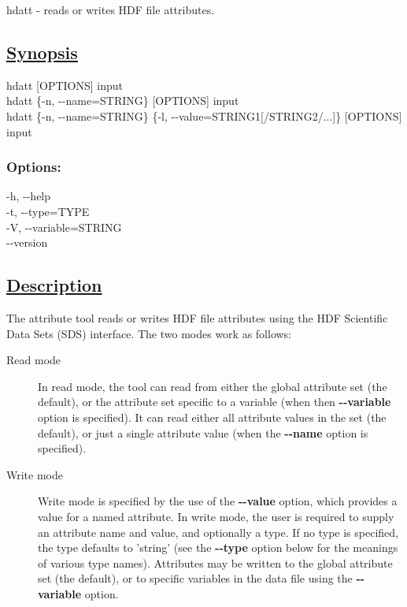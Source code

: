    hdatt - reads or writes HDF file attributes.  
\subsection*{\underline{Synopsis}}


  hdatt [OPTIONS] input\\ 
 hdatt \{-n, -{-}name=STRING\} [OPTIONS] input\\ 
 hdatt \{-n, -{-}name=STRING\} \{-l, -{-}value=STRING1[/STRING2/...]\} [OPTIONS] input\\ 

\subsubsection*{Options:}


  -h, -{-}help\\ 
 -t, -{-}type=TYPE\\ 
 -V, -{-}variable=STRING\\ 
 -{-}version \\ 

\subsection*{\underline{Description}}


 The attribute tool reads or writes HDF file attributes using the HDF Scientific Data Sets (SDS) interface. The two modes work as follows: \begin{description}
\item[Read mode]In read mode, the tool can read from either the global attribute set (the default), or the attribute set specific to a variable (when then \textbf{-{-}variable}
 option is specified). It can read either all attribute values in the set (the default), or just a single attribute value (when the \textbf{-{-}name}
 option is specified).
\item[Write mode]Write mode is specified by the use of the \textbf{-{-}value}
 option, which provides a value for a named attribute. In write mode, the user is required to supply an attribute name and value, and optionally a type. If no type is specified, the type defaults to 'string' (see the \textbf{-{-}type}
 option below for the meanings of various type names). Attributes may be written to the global attribute set (the default), or to specific variables in the data file using the \textbf{-{-}variable}
 option.

\end{description}



